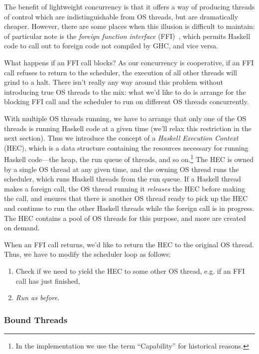 The benefit of lightweight concurrency is that it offers a way of
producing threads of control which are indistinguishable from OS
threads, but are dramatically cheaper.  However, there are some places
when this illusion is difficult to maintain: of particular note is the
\emph{foreign function interface} (FFI)~\cite{Marlow04extendingthe},
which permits Haskell code to call out to foreign code not compiled by
GHC, and vice versa.

What happens if an FFI call blocks?  As our
concurrency is cooperative, if an FFI call refuses to return to the
scheduler, the execution of all other threads will grind to a halt.
There isn't really any way around this problem without introducing true
OS threads to the mix: what we'd like to do is arrange for the blocking
FFI call and the scheduler to run on different OS threads concurrently.

With multiple OS threads running, we have to arrange that only one of
the OS threads is running Haskell code at a given time (we'll relax
this restriction in the next section).  Thus we introduce the concept
of a \emph{Haskell Execution Context} (HEC), which is a data structure
containing the resources necessary for running Haskell code---the
heap, the run queue of threads, and so on.\footnote{In the
  implementation we use the term ``Capability'' for historical
  reasons.} The HEC is owned by a single OS thread at any given time,
and the owning OS thread runs the scheduler, which runs Haskell
threads from the run queue.  If a Haskell thread makes a foreign call,
the OS thread running it \emph{releases} the HEC before making the
call, and ensures that there is another OS thread ready to pick up the
HEC and continue to run the other Haskell threads while the foreign
call is in progress.  The HEC contains a pool of OS threads for this
purpose, and more are created on demand.

When an FFI call returns, we'd like to return the HEC to the
original OS thread. Thus, we have to modify the scheduler loop as follows:

\begin{enumerate}
    \item Check if we need to yield the HEC to some other OS thread, e.g. if an FFI call has just finished,
    \item \emph{Run as before.}
\end{enumerate}

\subsubsection{Bound Threads}

